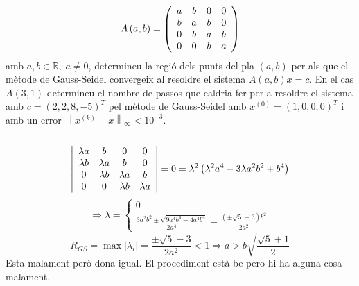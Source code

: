 \documentclass[../main.tex]{subfiles}
\begin{document}
    \begin{exercici}[30]
        \begin{displaymath}
            A\left(a,b\right) = \left(
                \begin{array}{c c c c}
                    a & b & 0 & 0\\
                    b & a & b & 0\\
                    0 & b & a & b\\
                    0 & 0 & b & a
                \end{array}
            \right)
        \end{displaymath}
        amb $a, b \in \mathbb{R},\; a \neq 0$, determineu la regió dels punts del pla $(a,b)$ per
        als que el mètode de Gauss-Seidel convergeix al resoldre el sistema $A\left(a,b\right)x = c$.
        En el cas $A\left(3, 1\right)$ determineu el nombre de passos que caldria fer per a resoldre
        el sistema amb $c = \left(2,2,8,-5\right)^T$ pel mètode de Gauss-Seidel amb $x^{(0)} = \left(1,0,0,0\right)^T$
        i amb un error $\left\lVert x^{(k)}-x\right\rVert _\infty < 10^{-3}$.\\\\
        \begin{displaymath}
            \left\lvert
                \begin{array}{c c c c}
                    \lambda a & b & 0 & 0\\
                    \lambda b & \lambda a & b & 0\\
                    0 & \lambda b & \lambda a & b\\
                    0 & 0 & \lambda b & \lambda a
                \end{array}
            \right\rvert = 0 = \lambda^2\left(\lambda^2 a^4 - 3\lambda a^2 b^2 + b^4\right)
        \end{displaymath}
        \begin{displaymath}
            \Rightarrow \lambda = \begin{cases}
                0\\
                \frac{3a^2 b^2 \pm \sqrt{9a^4 b^4 - 4a^4b^4}}{2a^4} = \frac{(\pm \sqrt{5}-3)b^2}{2a^2}
            \end{cases}
        \end{displaymath}
        \begin{displaymath}
            R_{GS} = \max{\left\lvert\lambda_i\right\rvert} = \frac{\pm \sqrt{5} - 3}{2a^2} < 1\Rightarrow a > b \sqrt{\frac{\sqrt{5}+1}{2}}
        \end{displaymath}
        Esta malament però dona igual. El procediment està be pero hi ha alguna cosa malament.
    \end{exercici}
\end{document}
